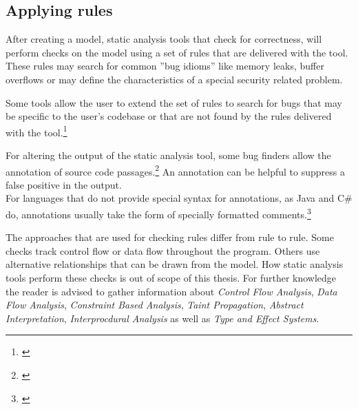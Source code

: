 \subsection{Applying rules}

After creating a model, static analysis tools that check for correctness, will perform checks on the model using a set of rules that are delivered with the tool. These rules may search for common ''bug idioms'' like memory leaks, buffer overflows or may define the characteristics of a special security related problem.

Some tools allow the user to extend the set of rules to search for bugs that may be specific to the user's codebase or that are not found by the rules delivered with the tool.\footnote{\citep[97]{SecureProgramming}}

For altering the output of the static analysis tool, some bug finders allow the annotation of source code passages.\footnote{\citep[99]{SecureProgramming}} An annotation can be helpful to suppress a false positive in the output.
\\For languages that do not provide special syntax for annotations, as Java and C\# do, annotations usually
take the form of specially formatted comments.\footnote{\citep[99]{SecureProgramming}}

The approaches that are used for checking rules differ from rule to rule. Some checks track control flow or data flow throughout the program. Others use alternative relationships that can be drawn from the model. How static analysis tools perform these checks is out of scope of this thesis. For further knowledge the reader is advised to gather information about \textit{Control Flow Analysis}, \textit{Data Flow Analysis}, \textit{Constraint Based Analysis}, \textit{Taint Propagation}, \textit{Abstract Interpretation}, \textit{Interprocdural Analysis }as well as \textit{Type and Effect Systems}. 